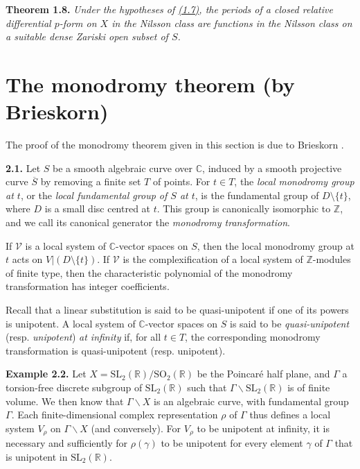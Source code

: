 \documentclass{report}
\newenvironment{itenv}[1]
  {\phantomsection\par\medskip\noindent\textbf{#1.}\itshape}
  {\medskip}
\newenvironment{rmenv}[1]
  {\phantomsection\par\medskip\noindent\textbf{#1.}\rmfamily}
  {\medskip}
\renewcommand{\cal}[1]{{\mathcal{#1}}}
\newcommand{\CC}{\mathbb{C}}
\newcommand{\ZZ}{\mathbb{Z}}
\newcommand{\SL}{\mathrm{SL}}
\newcommand{\SO}{\mathrm{SO}}
\newcommand{\oldpage}[1]{\marginpar{\footnotesize$\Big\vert$ \textit{p.~#1}}}
\begin{document}
\begin{itenv}{Theorem 1.8}
\label{III.1.8}
  Under the hypotheses of \hyperref[III.1.7]{(1.7)}, the periods of a closed relative differential $p$-form on $X$ in the Nilsson class are functions in the Nilsson class on a suitable dense Zariski open subset of $S$.
\end{itenv}


\section{The monodromy theorem (by Brieskorn)}
\label{III.2}

The proof of the monodromy theorem given in this section is due to Brieskorn \cite{5}.

\begin{rmenv}{2.1}
\label{III.2.1}
  Let $S$ be a smooth algebraic curve over $\CC$, induced by a smooth projective curve $\overline{S}$ by removing a finite set $T$ of points.
  For $t\in T$, the \emph{local monodromy group at $t$}, or the \emph{local fundamental group of $S$ at $t$}, is the fundamental group of $D\setminus\{t\}$, where $D$ is a small disc centred at $t$.
  This group is canonically isomorphic to $\ZZ$, and we call its canonical generator the \emph{monodromy transformation}.

  If $\cal{V}$ is a local system of $\CC$-vector spaces on $S$, then the local monodromy group at $t$ acts on $V|(D\setminus\{t\})$.
  If $\cal{V}$ is the complexification of a local system of $\ZZ$-modules of finite type, then the characteristic polynomial of the monodromy transformation has integer coefficients.

  Recall that a linear substitution is said to be quasi-unipotent if one of its powers is unipotent.
  A local system of $\CC$-vector spaces on $S$ is said to be \emph{quasi-unipotent} (resp. \emph{unipotent}) \emph{at infinity} if, for all $t\in T$, the corresponding monodromy transformation is quasi-unipotent (resp. unipotent).
\end{rmenv}

\oldpage{126}
\begin{rmenv}{Example 2.2}
\label{III.2.2}
  Let $X=\SL_2(\mathbb{R})/\SO_2(\mathbb{R})$ be the Poincar\'{e} half plane, and $\Gamma$ a torsion-free discrete subgroup of $\SL_2(\mathbb{R})$ such that $\Gamma\backslash\SL_2(\mathbb{R})$ is of finite volume.
  We then know that $\Gamma\backslash X$ is an algebraic curve, with fundamental group $\Gamma$.
  Each finite-dimensional complex representation $\rho$ of $\Gamma$ thus defines a local system $V_\rho$ on $\Gamma\backslash X$ (and conversely).
  For $V_\rho$ to be unipotent at infinity, it is necessary and sufficiently for $\rho(\gamma)$ to be unipotent for every element $\gamma$ of $\Gamma$ that is unipotent in $\SL_2(\mathbb{R})$.
\end{rmenv}
\end{document}
